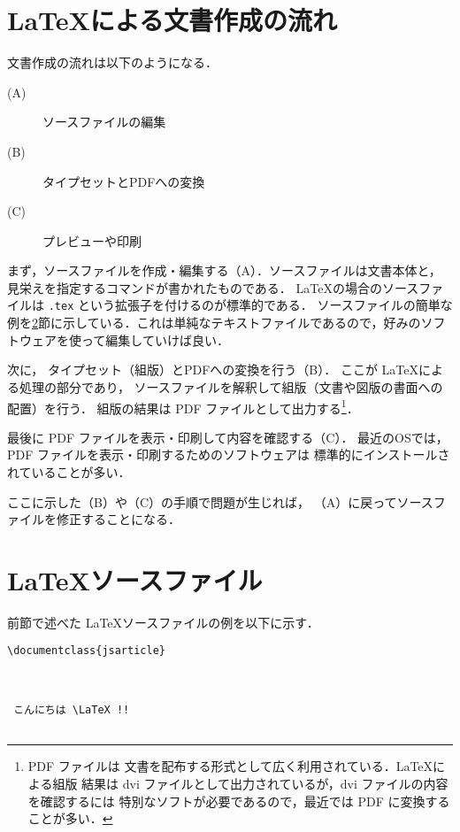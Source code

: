 \section{\LaTeX による文書作成の流れ}

文書作成の流れは以下のようになる．

\begin{description}
\item[(A)] ソースファイルの編集
\item[(B)] タイプセットとPDFへの変換
\item[(C)] プレビューや印刷
\end{description}

まず，ソースファイルを作成・編集する（A）．ソースファイルは文書本体と，
見栄えを指定するコマンドが書かれたものである．
\LaTeX の場合のソースファイルは \verb|.tex| という拡張子を付けるのが標準的である．
ソースファイルの簡単な例を\ref{sec:source}節に示している．これは単純なテキストファイルであるので，好みのソフトウェアを使って編集していけば良い．

次に， タイプセット（組版）とPDFへの変換を行う（B）．
ここが \LaTeX による処理の部分であり，
ソースファイルを解釈して組版（文書や図版の書面への配置）を行う．
組版の結果は PDF ファイルとして出力する\footnote{PDF ファイルは
文書を配布する形式として広く利用されている．\LaTeX による組版
結果は dvi ファイルとして出力されているが，dvi ファイルの内容を確認するには
特別なソフトが必要であるので，最近では PDF に変換することが多い．}．

最後に PDF ファイルを表示・印刷して内容を確認する（C）．
最近のOSでは，PDF ファイルを表示・印刷するためのソフトウェアは
標準的にインストールされていることが多い．

ここに示した（B）や（C）の手順で問題が生じれば，
（A）に戻ってソースファイルを修正することになる．

\section{\LaTeX ソースファイル}
\label{sec:source}

前節で述べた \LaTeX ソースファイルの例を以下に示す．

\begin{screen}
\begin{verbatim}
\documentclass{jsarticle}



 こんにちは \LaTeX !!


\end{verbatim}
\end{screen}

